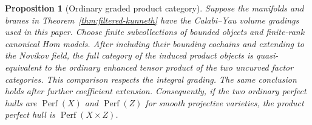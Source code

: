 \documentclass[11pt]{article}
\numberwithin{equation}{section}
\newtheorem{proposition}[theorem]{Proposition}
\theoremstyle{definition}
\theoremstyle{remark}
\begin{document}
\begin{proposition}[Ordinary graded product category]
\label{prop:ordinary-kunneth}
Suppose the manifolds and branes in
Theorem~\ref{thm:filtered-kunneth} have the Calabi--Yau volume
gradings used in this paper.  Choose finite subcollections of
bounded objects and finite-rank canonical Hom models.  After
including their bounding cochains and extending to the Novikov
field, the full category of the induced product objects is
quasi-equivalent to the ordinary enhanced tensor product of
the two uncurved factor categories.  This comparison respects
the integral grading.  The same conclusion holds after further
coefficient extension.  Consequently, if the two ordinary
perfect hulls are $\operatorname{Perf}(X)$ and $\operatorname{Perf}(Z)$ for smooth projective
varieties, the product perfect hull is $\operatorname{Perf}(X\times Z)$.
\end{proposition}
\end{document}
